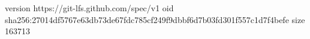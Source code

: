 version https://git-lfs.github.com/spec/v1
oid sha256:27014df5767e63db73de67fdc785cf249f9dbbf6d7b03fd301f557c1d7f4befe
size 163713

